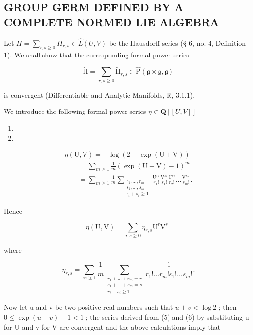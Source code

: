 \subsection{GROUP GERM DEFINED BY A COMPLETE NORMED LIE ALGEBRA}

Let \(H = \sum_{r,s \geqslant 0} H_{r,s} \in \hat{L}(U, V)\) be the Hausdorff series (§ 6, no. 4, Definition 1). We shall show that the corresponding formal power series

\[
\tilde {\mathrm{H}} = \sum_ {r, s \geqslant 0} \tilde {\mathrm{H}} _ {r, s} \in \hat {\mathrm{P}} (\mathfrak {g} \times \mathfrak {g}, \mathfrak {g})\tag{3}
\]

is convergent (Differentiable and Analytic Manifolds, R, 3.1.1).

We introduce the following formal power series \(\eta\in\mathbf{Q}[[U,V]]\)

\begin{enumerate}
\def\labelenumi{(\arabic{enumi})}
\setcounter{enumi}{3}
\tightlist
\item
\item
\end{enumerate}

\[
\begin{array}{l}\eta (\mathrm{U},\mathrm{V}) = -\log (2 - \exp (\mathrm{U} + \mathrm{V}))\\ \qquad = \sum_{m\geqslant 1}\frac{1}{m} (\exp (\mathrm{U} + \mathrm{V}) - 1)^{m}\\ \qquad = \sum_{m\geqslant 1}\frac{1}{m}\sum_{\substack{r_{1},\ldots ,r_{m}\\ s_{1},\ldots ,s_{m}\\ r_{i} + s_{i}\geqslant 1}}\frac{\mathrm{U}^{r_{1}}}{r_{1}!}\frac{\mathrm{V}^{s_{1}}}{s_{1}!}\frac{\mathrm{U}^{r_{2}}}{r_{2}!}\dots \frac{\mathrm{V}^{s_{m}}}{s_{m}!}. \end{array}\tag{6}
\]

Hence

\[
\eta (\mathrm{U}, \mathrm{V}) = \sum_ {r, s \geqslant 0} \eta_ {r, s} \mathrm{U} ^ {r} \mathrm{V} ^ {s},\tag{7}
\]

where

\[
\eta_{r,s} = \sum_{m\geqslant 1}\frac{1}{m}\sum_{\substack{r_{1} + \dots +r_{m} = r\\ s_{1} + \dots +s_{m} = s\\ r_{i} + s_{i}\geqslant 1}}\frac{1}{r_{1}!\ldots r_{m}!s_{1}!\ldots s_{m}!}.\tag{8}
\]

Now let u and v be two positive real numbers such that \(u + v < \log 2\) ; then \(0 \leqslant \exp(u + v) - 1 < 1\) ; the series derived from (5) and (6) by substituting u for U and v for V are convergent and the above calculations imply that

